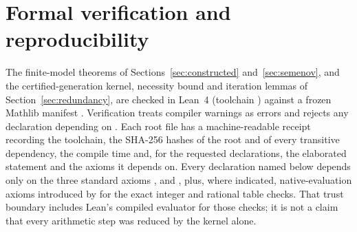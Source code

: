 \section{Formal verification and reproducibility}\label{app:verification}

The finite-model theorems of Sections~\ref{sec:constructed} and~\ref{sec:semenov}, and the certified-generation kernel, necessity bound and iteration lemmas of Section~\ref{sec:redundancy}, are checked in Lean~4 (toolchain ) against a frozen Mathlib manifest \citep{demoura2021,mathlib2020}. Verification treats compiler warnings as errors and rejects any declaration depending on . Each root file has a machine-readable receipt recording the toolchain, the SHA-256 hashes of the root and of every transitive dependency, the compile time and, for the requested declarations, the elaborated statement and the axioms it depends on. Every declaration named below depends only on the three standard axioms ,  and , plus, where indicated, native-evaluation axioms introduced by  for the exact integer and rational table checks. That trust boundary includes Lean's compiled evaluator for those checks; it is not a claim that every arithmetic step was reduced by the kernel alone.

